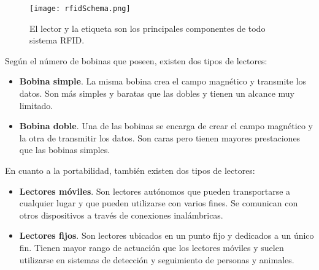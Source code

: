   \begin{figure}[!h]
    \begin{center}
      \texttt{[image: rfidSchema.png]}
      \caption{El lector y la etiqueta son los principales componentes de todo
sistema \acs{RFID}.}
      \label{fig:rfidSchema}
    \end{center}
  \end{figure}

  Según el número de bobinas que poseen, existen dos tipos de lectores:
  \begin{itemize}
  \item \textbf{Bobina simple}. La misma bobina crea el campo magnético y
  transmite los datos. Son más simples y baratas que las dobles y tienen
  un alcance muy limitado.
  \item \textbf{Bobina doble}. Una de las bobinas se encarga de crear el
  campo magnético y la otra de transmitir los datos. Son caras pero tienen
  mayores prestaciones que las bobinas simples.
  \end{itemize}
  
  En cuanto a la portabilidad, también existen dos tipos de lectores:
  \begin{itemize}
  \item \textbf{Lectores móviles}. Son lectores autónomos que pueden 
  transportarse a cualquier lugar y que pueden utilizarse con varios fines. Se
  comunican con otros dispositivos a través de conexiones inalámbricas.
  \item \textbf{Lectores fijos}. Son lectores ubicados en un punto fijo y 
  dedicados a un único fin. Tienen mayor rango de actuación que los lectores
  móviles y suelen utilizarse en sistemas de detección y seguimiento de
  personas y animales.
  \end{itemize}

  


